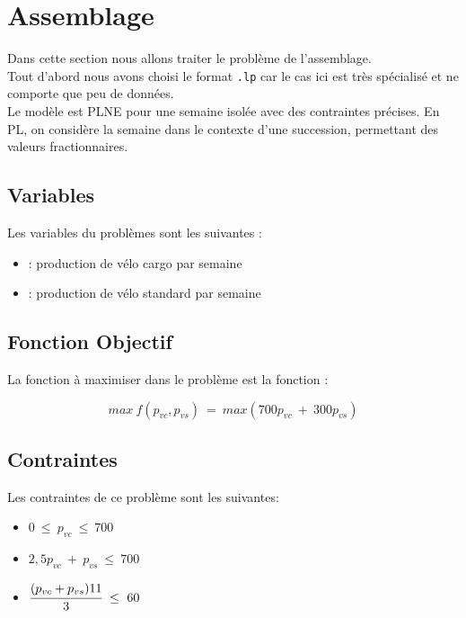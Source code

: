 \section{Assemblage}
Dans cette section nous allons traiter le problème de l'assemblage.\\

Tout d'abord nous avons choisi le format \texttt{.lp} car le cas ici est très spécialisé et ne comporte que peu de données.\\

Le modèle est PLNE pour une semaine isolée avec des contraintes précises. En PL, on considère la semaine dans le contexte d'une succession, permettant des valeurs fractionnaires.

\subsection{Variables}
Les variables du problèmes sont les suivantes : \newline

\begin{itemize}

\item {} : production de vélo cargo par semaine \newline
\item {} : production de vélo standard par semaine \newline

\end{itemize}

\subsection{Fonction Objectif}
La fonction à maximiser dans le problème est la fonction :

$$max\ f(p_{vc},p_{vs})\ =\ max(700p_{vc}\ +\ 300 p_{vs})$$

\subsection{Contraintes}
Les contraintes de ce problème sont les suivantes:

\begin{itemize}

\item $ 0\ \le\ p_{vc}\ \le\ 700 $
\item $2,5 p_{vc}\ +\ p_{vs}\ \le\ 700 $
\item $\cfrac{(p_{vc} + p_{vs})11}{3}\ \le\ 60 $
\end{itemize}

